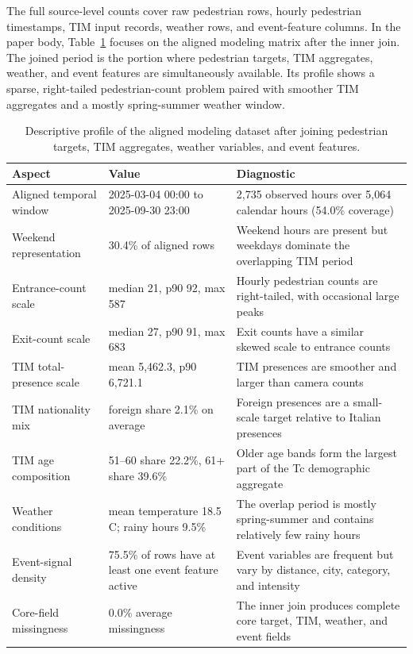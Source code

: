 The full source-level counts cover raw pedestrian rows, hourly pedestrian
timestamps, TIM input records, weather rows, and event-feature columns. In the
paper body, Table~\ref{tab:dataset-profile} focuses on the aligned modeling
matrix after the inner join. The joined period is the portion where pedestrian
targets, TIM aggregates, weather, and event features are simultaneously
available. Its profile shows a sparse, right-tailed pedestrian-count problem
paired with smoother TIM aggregates and a mostly spring-summer weather window.

\begin{table}
\caption{Descriptive profile of the aligned modeling dataset after joining pedestrian targets, TIM aggregates, weather variables, and event features.}
\label{tab:dataset-profile}
\centering
\scriptsize
\setlength{\tabcolsep}{3pt}
\begin{tabularx}{\textwidth}{lXX}
\toprule
Aspect & Value & Diagnostic \\
\midrule
Aligned temporal window & 2025-03-04 00:00 to 2025-09-30 23:00 & 2,735 observed hours over 5,064 calendar hours (54.0\% coverage) \\
Weekend representation & 30.4\% of aligned rows & Weekend hours are present but weekdays dominate the overlapping TIM period \\
Entrance-count scale & median 21, p90 92, max 587 & Hourly pedestrian counts are right-tailed, with occasional large peaks \\
Exit-count scale & median 27, p90 91, max 683 & Exit counts have a similar skewed scale to entrance counts \\
TIM total-presence scale & mean 5,462.3, p90 6,721.1 & TIM presences are smoother and larger than camera counts \\
TIM nationality mix & foreign share 2.1\% on average & Foreign presences are a small-scale target relative to Italian presences \\
TIM age composition & 51--60 share 22.2\%, 61+ share 39.6\% & Older age bands form the largest part of the Tc demographic aggregate \\
Weather conditions & mean temperature 18.5 C; rainy hours 9.5\% & The overlap period is mostly spring-summer and contains relatively few rainy hours \\
Event-signal density & 75.5\% of rows have at least one event feature active & Event variables are frequent but vary by distance, city, category, and intensity \\
Core-field missingness & 0.0\% average missingness & The inner join produces complete core target, TIM, weather, and event fields \\
\bottomrule
\end{tabularx}
\end{table}

